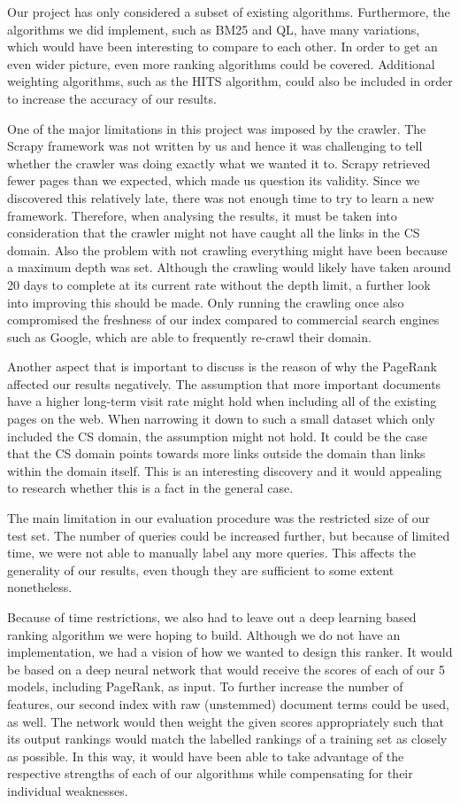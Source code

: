 Our project has only considered a subset of existing algorithms. Furthermore, the algorithms we did implement, such as BM25 and QL, have many variations, which would have been interesting to compare to each other. In order to get an even wider picture, even more ranking algorithms could be covered. Additional weighting algorithms, such as the HITS algorithm, could also be included in order to increase the accuracy of our results.

One of the major limitations in this project was imposed by the crawler. The Scrapy framework was not written by us and hence it was challenging to tell whether the crawler was doing exactly what we wanted it to. Scrapy retrieved fewer pages than we expected, which made us question its validity. Since we discovered this relatively late, there was not enough time to try to learn a new framework. Therefore, when analysing the results, it must be taken into consideration that the crawler might not have caught all the links in the CS domain. Also the problem with not crawling everything might have been because a maximum depth was set. Although the crawling would likely have taken around 20 days to complete at its current rate without the depth limit, a further look into improving this should be made. Only running the crawling once also compromised the freshness of our index compared to commercial search engines such as Google, which are able to frequently re-crawl their domain.

Another aspect that is important to discuss is the reason of why the PageRank affected our results negatively. The assumption that more important documents have a higher long-term visit rate might hold when including all of the existing pages on the web. When narrowing it down to such a small dataset which only included the CS domain, the assumption might not hold. It could be the case that the CS domain points towards more links outside the domain than links within the domain itself. This is an interesting discovery and it would appealing to research whether this is a fact in the general case.

The main limitation in our evaluation procedure was the restricted size of our test set. The number of queries could be increased further, but because of limited time, we were not able to manually label any more queries. This affects the generality of our results, even though they are sufficient to some extent nonetheless.

Because of time restrictions, we also had to leave out a deep learning based ranking algorithm we were hoping to build. Although we do not have an implementation, we had a vision of how we wanted to design this ranker. It would be based on a deep neural network that would receive the scores of each of our 5 models, including PageRank, as input. To further increase the number of features, our second index with raw (unstemmed) document terms could be used, as well. The network would then weight the given scores appropriately such that its output rankings would match the labelled rankings of a training set as closely as possible. In this way, it would have been able to take advantage of the respective strengths of each of our algorithms while compensating for their individual weaknesses.

